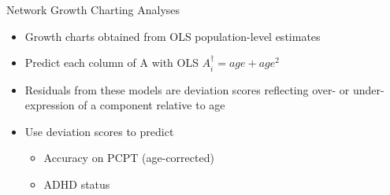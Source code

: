 \documentclass[presentation]{beamer}
\begin{document}
\begin{frame}[label={sec:orgheadline18}]{Network Growth Charting Analyses}
\begin{itemize}
\item Growth charts obtained from OLS population-level estimates
\item Predict each column of A with OLS \(A^{\dagger}_i = age + age^2\)
\item Residuals from these models are \alert{deviation scores} reflecting over- or under- expression of a component relative to age
\item Use \alert{deviation scores} to predict
\begin{itemize}
\item Accuracy on PCPT (age-corrected)
\item ADHD status
\end{itemize}
\end{itemize}
\end{frame}
\end{document}
